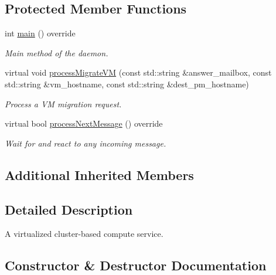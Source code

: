 \subsection*{Protected Member Functions}
\begin{DoxyCompactItemize}
\item 
int \hyperlink{classwrench_1_1_virtualized_cluster_service_aa900061ac9077df089dfe760c921ec27}{main} () override
\begin{DoxyCompactList}\small\item\em Main method of the daemon. \end{DoxyCompactList}\item 
virtual void \hyperlink{classwrench_1_1_virtualized_cluster_service_a81830c39907cda3d88379f99bb9b145a}{process\+Migrate\+VM} (const std\+::string \&answer\+\_\+mailbox, const std\+::string \&vm\+\_\+hostname, const std\+::string \&dest\+\_\+pm\+\_\+hostname)
\begin{DoxyCompactList}\small\item\em Process a VM migration request. \end{DoxyCompactList}\item 
virtual bool \hyperlink{classwrench_1_1_virtualized_cluster_service_aa9586ab2cda7b17c2ccccb5c465669af}{process\+Next\+Message} () override
\begin{DoxyCompactList}\small\item\em Wait for and react to any incoming message. \end{DoxyCompactList}\end{DoxyCompactItemize}
\subsection*{Additional Inherited Members}


\subsection{Detailed Description}
A virtualized cluster-\/based compute service. 

\subsection{Constructor \& Destructor Documentation}
\mbox{\label{classwrench_1_1_virtualized_cluster_service_a7be5224d65410f4570ce9f9e9c835bd5}} 
